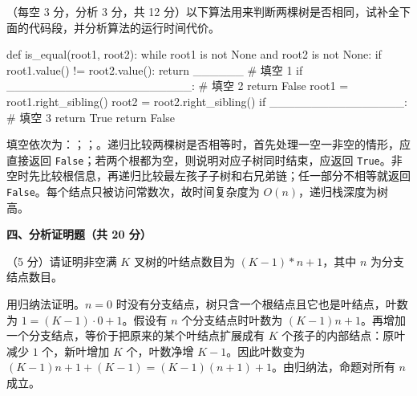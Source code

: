 \begin{question}
（每空 3 分，分析 3 分，共 12 分）以下算法用来判断两棵树是否相同，试补全下面的代码段，并分析算法的运行时间代价。
\begin{pycode}
def is_equal(root1, root2):
    while root1 is not None and root2 is not None:
        if root1.value() != root2.value():
            return ______          # 填空 1
        if ______________________: # 填空 2
            return False
        root1 = root1.right_sibling()
        root2 = root2.right_sibling()
    if ________________:           # 填空 3
        return True
    return False
\end{pycode}
\begin{solution}
填空依次为：\texttt{}；\texttt{}；\texttt{}。递归比较两棵树是否相等时，首先处理一空一非空的情形，应直接返回 \texttt{False}；若两个根都为空，则说明对应子树同时结束，应返回 \texttt{True}。非空时先比较根信息，再递归比较最左孩子子树和右兄弟链；任一部分不相等就返回 \texttt{False}。每个结点只被访问常数次，故时间复杂度为 $O(n)$，递归栈深度为树高。
\end{solution}
\end{question}

\textbf{四、分析证明题（共 20 分）}

\begin{question}
（5 分）请证明非空满 $K$ 叉树的叶结点数目为 $(K-1)*n+1$，其中 $n$ 为分支结点数目。
\begin{solution}
用归纳法证明。$n=0$ 时没有分支结点，树只含一个根结点且它也是叶结点，叶数为 $1=(K-1)\cdot0+1$。假设有 $n$ 个分支结点时叶数为 $(K-1)n+1$。再增加一个分支结点，等价于把原来的某个叶结点扩展成有 $K$ 个孩子的内部结点：原叶减少 $1$ 个，新叶增加 $K$ 个，叶数净增 $K-1$。因此叶数变为 $(K-1)n+1+(K-1)=(K-1)(n+1)+1$。由归纳法，命题对所有 $n$ 成立。
\end{solution}
\end{question}

